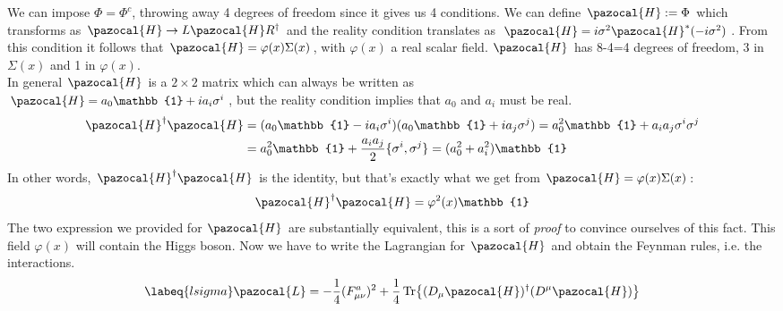 \documentclass[../main.tex]{subfiles}
\begin{document}
We can impose $\Phi=\Phi^c$, throwing away 4 degrees of freedom since it gives us 4 conditions. We can define $\pazocal{H}:=\Phi$ which transforms as $\pazocal{H}\to L\pazocal{H}R^\dagger$ and the reality condition translates as $\pazocal{H}=i\sigma^2\pazocal{H}^*(-i\sigma^2)$. From this condition it follows that $\pazocal{H}=\varphi(x)\Sigma(x)$, with $\varphi(x)$ a real scalar field. $\pazocal{H}$ has 8-4=4 degrees of freedom, 3 in $\Sigma(x)$ and 1 in $\varphi(x)$.\\
In general $\pazocal{H}$ is a $2\times2$ matrix which can always be written as\\
$\pazocal{H}=a_0\mathbb{1}+ia_i\sigma^i$, but the reality condition implies that $a_0$ and $a_i$ must be real.
\begin{align*}
\pazocal{H}^\dagger\pazocal{H}&=(a_0\mathbb{1}-ia_i\sigma^i)(a_0\mathbb{1}+ia_j\sigma^j)=a_0^2\mathbb{1}+a_ia_j\sigma^i\sigma^j\\
&=a_0^2\mathbb{1}+\frac{a_ia_j}{2}\{\sigma^i,\sigma^j\}=(a_0^2+a_i^2)\mathbb{1}
\end{align*}
In other words, $\pazocal{H}^\dagger\pazocal{H}$ is the identity, but that's exactly what we get from $\pazocal{H}=\varphi(x)\Sigma(x)$:
\[
\pazocal{H}^\dagger\pazocal{H}=\varphi^2(x)\mathbb{1}
\]
The two expression we provided for $\pazocal{H}$ are substantially equivalent, this is a sort of \textit{proof} to convince ourselves of this fact. This field $\varphi(x)$ will contain the Higgs boson. Now we have to write the Lagrangian for $\pazocal{H}$ and obtain the Feynman rules, i.e. the interactions.
\begin{equation}
\labeq{lsigma}    
\pazocal{L}=-\frac{1}{4}(F_{\mu\nu}^a)^2+\frac{1}{4}\Tr{(D_\mu\pazocal{H})^\dagger(D^\mu\pazocal{H})}
\end{equation}
\end{document}
